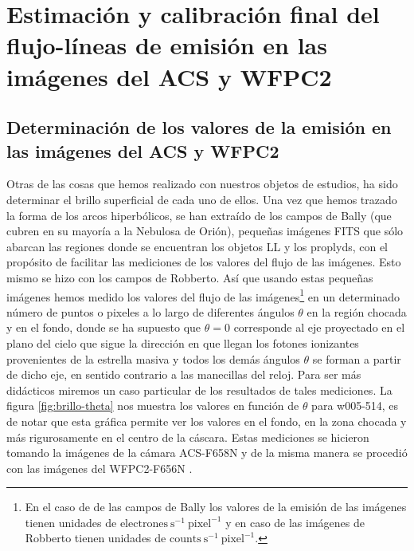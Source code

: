 \section{Estimación y calibración final del flujo-líneas de emisión en las imágenes del ACS y WFPC2}
\label{sec:clibration-final}

\subsection{Determinación de los valores  de la emisión en las imágenes del ACS y WFPC2 }
\label{sec:brillo-superficial}
Otras de las cosas que hemos realizado con nuestros objetos de estudios, ha sido determinar el brillo superficial de cada uno de ellos. Una vez que hemos trazado la forma de los arcos hiperbólicos, se han extraído de los campos de Bally (que cubren en su mayoría a la Nebulosa de Orión), pequeñas imágenes FITS que sólo abarcan las regiones donde se encuentran los objetos LL y los proplyds, con el propósito de facilitar las mediciones de los valores del flujo de las imágenes. Esto mismo se hizo con los campos de Robberto. Así que usando estas pequeñas imágenes hemos medido los valores del flujo de las imágenes\footnote{En el caso de de las campos de Bally los valores de la emisión de las imágenes tienen unidades de \(\mathrm{electrones~s^{-1}~pixel^{-1}}\) y en caso de las imágenes de Robberto tienen unidades de \(\text{counts}~\text{s}^{-1}~\text{pixel}^{-1}\).} en un determinado número de puntos o pixeles a lo largo de diferentes ángulos \(\theta\) en la región chocada y en el fondo, donde se ha supuesto que \(\theta = 0\) corresponde al eje proyectado en el plano del cielo que sigue la dirección en que llegan los fotones ionizantes provenientes de la estrella masiva y todos los demás ángulos \(\theta\) se forman a partir de dicho eje, en sentido contrario a las manecillas del reloj. Para ser más didácticos miremos un caso particular de los resultados de tales mediciones. La figura \ref{fig:brillo-theta} nos muestra los valores en función de \(\theta\) para w005-514, es de notar que esta gráfica permite ver los valores en el fondo, en la zona chocada y más rigurosamente en el centro de la cáscara. Estas mediciones se hicieron tomando la imágenes de la cámara ACS-F658N y de la misma manera se procedió con las imágenes del WFPC2-F656N \citep{Robberto:2013a}. \\

